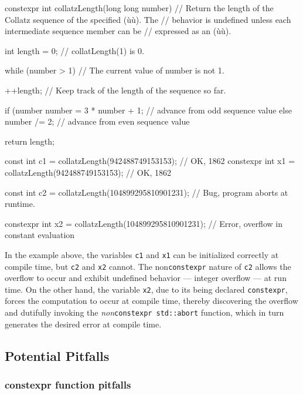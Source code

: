 \begin{emcppslisting}[emcppsstandards={c++14}]
constexpr int collatzLength(long long number)
    // Return the length of the Collatz sequence of the specified (ù{}ù). The
    // behavior is undefined unless each intermediate sequence member can be
    // expressed as an (ù{}ù).
{
    int length = 0;         // collatLength(1) is 0.

    while (number > 1)      // The current value of number is not 1.
    {
        ++length;           // Keep track of the length of the sequence so far.

        if (number %
        {
            number = 3 * number + 1;    // advance from odd sequence value
        }
        else
        {
            number /= 2;                // advance from even sequence value
        }
    }

    return length;
}

const     int c1 = collatzLength(942488749153153);  // OK, 1862
constexpr int x1 = collatzLength(942488749153153);  // OK, 1862

const int c2 = collatzLength(104899295810901231);
    // Bug, program aborts at runtime.

constexpr int x2 = collatzLength(104899295810901231);
    // Error, overflow in constant evaluation
\end{emcppslisting}
    
\noindent In the example above, the variables \lstinline!c1! and \lstinline!x1! can be
initialized correctly at compile time, but \lstinline!c2! and \lstinline!x2!
cannot. The non\lstinline!constexpr! nature of \lstinline!c2! allows the
overflow to occur and exhibit undefined behavior --- integer overflow
--- at run time. On the other hand, the variable \lstinline!x2!, due to
its being declared \lstinline!constexpr!, forces the computation to
occur at compile time, thereby discovering the overflow and dutifully
invoking the \emph{non}\lstinline!constexpr!~\lstinline!std::abort! function,
which in turn generates the desired error at compile time.

\subsection[Potential Pitfalls]{Potential Pitfalls}\label{potential-pitfalls-constexprvar}

\subsubsection[\lstinline!constexpr! function pitfalls]{{\SubsubsecCode constexpr} function pitfalls}\label{constexpr-function-pitfalls}

